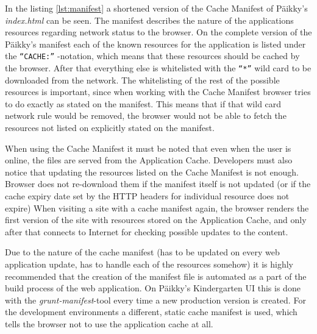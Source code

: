 In the listing \ref{lst:manifest} a shortened version of the Cache Manifest of Päikky's \textit{index.html} can be seen. The manifest describes the nature of the applications resources regarding network status to the browser. On the complete version of the Päikky's manifest each of the known resources for the application is listed under the \texttt{``CACHE:''} -notation, which means that these resources should be cached by the browser. After that everything else is whitelisted with the \texttt{``*''} wild card to be downloaded from the network. The whitelisting of the rest of the possible resources is important, since when working with the Cache Manifest browser tries to do exactly as stated on the manifest. This means that if that wild card network rule would be removed, the browser would not be able to fetch the resources not listed on explicitly stated on the manifest. \cite[Page 212]{lawson_introducing_2011}%


When using the Cache Manifest it must be noted that even when the user is online, the files are served from the Application Cache. Developers must also notice that updating the resources listed on the Cache Manifest is not enough. Browser does not re-download them if the manifest itself is not updated (or if the cache expiry date set by the HTTP headers for individual resource does not expire) When visiting a site with a cache manifest again, the browser renders the first version of the site with resources stored on the Application Cache, and only after that connects to Internet for checking possible updates to the content. \cite{archibald_application_2012}

Due to the nature of the cache manifest (has to be updated on every web application update, has to handle each of the resources somehow) it is highly recommended that the creation of the manifest file is automated as a part of the build process of the web application. On Päikky's Kindergarten UI this is done with the \textit{grunt-manifest}-tool every time a new production version is created. For the development environments a different, static cache manifest is used, which tells the browser not to use the application cache at all.

